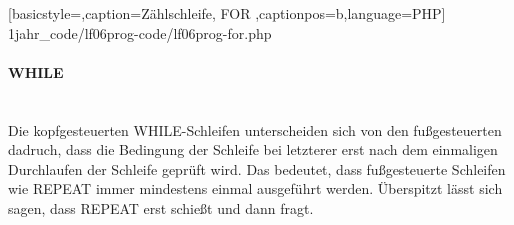 
	[basicstyle=\small,caption={Zählschleife, FOR}
	\label{lst:while-fuss},captionpos=b,language=PHP]
	{1jahr_code/lf06prog-code/lf06prog-for.php}

\paragraph{WHILE}~\\

Die kopfgesteuerten WHILE-Schleifen unterscheiden sich von den fußgesteuerten dadruch, dass die Bedingung der Schleife bei letzterer erst nach dem einmaligen Durchlaufen der Schleife geprüft wird. Das bedeutet, dass fußgesteuerte Schleifen wie REPEAT immer mindestens einmal ausgeführt werden. Überspitzt lässt sich sagen, dass REPEAT erst schießt und dann fragt.

